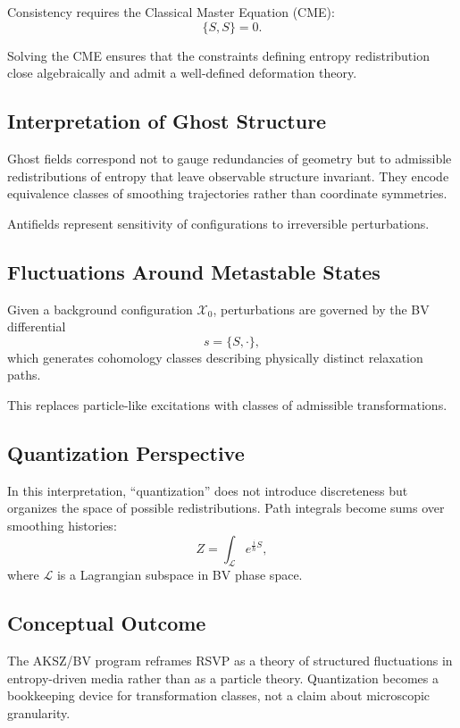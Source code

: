 \documentclass[12pt]{article}
\begin{document}
Consistency requires the Classical Master Equation (CME):
\[
\{S,S\}=0.
\]

Solving the CME ensures that the constraints defining entropy redistribution close algebraically and admit a well-defined deformation theory.

\subsection{Interpretation of Ghost Structure}

Ghost fields correspond not to gauge redundancies of geometry but to admissible redistributions of entropy that leave observable structure invariant. They encode equivalence classes of smoothing trajectories rather than coordinate symmetries.

Antifields represent sensitivity of configurations to irreversible perturbations.

\subsection{Fluctuations Around Metastable States}

Given a background configuration $\mathcal{X}_0$, perturbations are governed by the BV differential
\[
s = \{S,\cdot\},
\]
which generates cohomology classes describing physically distinct relaxation paths.

This replaces particle-like excitations with classes of admissible transformations.

\subsection{Quantization Perspective}

In this interpretation, ``quantization'' does not introduce discreteness but organizes the space of possible redistributions. Path integrals become sums over smoothing histories:
\[
Z = \int_{\mathcal{L}} e^{\frac{i}{\hbar}S},
\]
where $\mathcal{L}$ is a Lagrangian subspace in BV phase space.

\subsection{Conceptual Outcome}

The AKSZ/BV program reframes RSVP as a theory of structured fluctuations in entropy-driven media rather than as a particle theory. Quantization becomes a bookkeeping device for transformation classes, not a claim about microscopic granularity.
\end{document}
